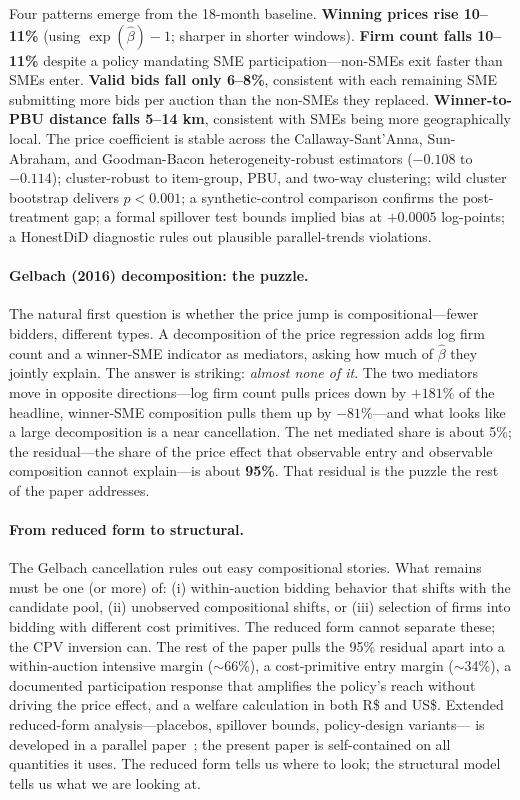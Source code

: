 \documentclass[12pt]{article}
\begin{document}
Four patterns emerge from the 18-month baseline.
\textbf{Winning prices rise 10--11\%} (using $\exp(\hat\beta) - 1$;
sharper in shorter windows). \textbf{Firm count falls 10--11\%}
despite a policy mandating SME participation---non-SMEs exit
faster than SMEs enter. \textbf{Valid bids fall only 6--8\%},
consistent with each remaining SME submitting more bids per
auction than the non-SMEs they replaced. \textbf{Winner-to-PBU
distance falls 5--14 km}, consistent with SMEs being more
geographically local. The price coefficient is stable across the
Callaway-Sant'Anna, Sun-Abraham, and Goodman-Bacon
heterogeneity-robust estimators ($-0.108$ to $-0.114$);
cluster-robust to item-group, PBU, and two-way clustering; wild
cluster bootstrap delivers $p < 0.001$; a synthetic-control
comparison confirms the post-treatment gap; a formal spillover
test bounds implied bias at $+0.0005$ log-points; a
\citet{rambachan2023} HonestDiD diagnostic rules out plausible
parallel-trends violations.

\paragraph{Gelbach (2016) decomposition: the puzzle.}
The natural first question is whether the price jump is
compositional---fewer bidders, different types. A
\citet{gelbach2016} decomposition of the price regression adds
log firm count and a winner-SME indicator as mediators, asking
how much of $\hat\beta$ they jointly explain. The answer is
striking: \emph{almost none of it}. The two mediators move in
opposite directions---log firm count pulls prices down by
$+181\%$ of the headline, winner-SME composition pulls them up
by $-81\%$---and what looks like a large decomposition is a near
cancellation. The net mediated share is about 5\%; the
residual---the share of the price effect that observable entry
and observable composition cannot explain---is about
\textbf{95\%}. That residual is the puzzle the rest of the paper
addresses.

\paragraph{From reduced form to structural.}
The Gelbach cancellation rules out easy compositional stories.
What remains must be one (or more) of: (i) within-auction
bidding behavior that shifts with the candidate pool, (ii)
unobserved compositional shifts, or (iii) selection of firms
into bidding with different cost primitives. The reduced form
cannot separate these; the CPV inversion can. The rest of the
paper pulls the 95\% residual apart into a within-auction
intensive margin ($\sim$66\%), a cost-primitive entry margin
($\sim$34\%), a documented participation response that amplifies
the policy's reach without driving the price effect, and a
welfare calculation in both R\$ and US\$. Extended reduced-form
analysis---placebos, spillover bounds, policy-design variants---
is developed in a parallel paper~\citep{genicolo2026a}; the
present paper is self-contained on all quantities it uses. The
reduced form tells us where to look; the structural model tells
us what we are looking at.
\end{document}
